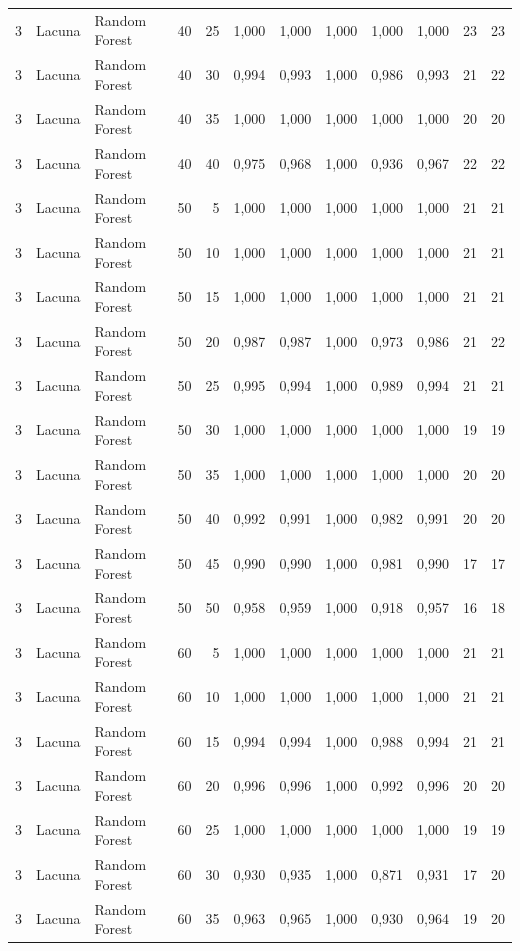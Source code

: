 \begin{longtable}{@{}rllrrrrrrrrr@{}}
3 & Lacuna & Random Forest & 40 & 25 & 1,000 & 1,000 & 1,000 & 1,000 & 1,000 & 23 & 23 \\
3 & Lacuna & Random Forest & 40 & 30 & 0,994 & 0,993 & 1,000 & 0,986 & 0,993 & 21 & 22 \\
3 & Lacuna & Random Forest & 40 & 35 & 1,000 & 1,000 & 1,000 & 1,000 & 1,000 & 20 & 20 \\
3 & Lacuna & Random Forest & 40 & 40 & 0,975 & 0,968 & 1,000 & 0,936 & 0,967 & 22 & 22 \\
3 & Lacuna & Random Forest & 50 & 5 & 1,000 & 1,000 & 1,000 & 1,000 & 1,000 & 21 & 21 \\
3 & Lacuna & Random Forest & 50 & 10 & 1,000 & 1,000 & 1,000 & 1,000 & 1,000 & 21 & 21 \\
3 & Lacuna & Random Forest & 50 & 15 & 1,000 & 1,000 & 1,000 & 1,000 & 1,000 & 21 & 21 \\
3 & Lacuna & Random Forest & 50 & 20 & 0,987 & 0,987 & 1,000 & 0,973 & 0,986 & 21 & 22 \\
3 & Lacuna & Random Forest & 50 & 25 & 0,995 & 0,994 & 1,000 & 0,989 & 0,994 & 21 & 21 \\
3 & Lacuna & Random Forest & 50 & 30 & 1,000 & 1,000 & 1,000 & 1,000 & 1,000 & 19 & 19 \\
3 & Lacuna & Random Forest & 50 & 35 & 1,000 & 1,000 & 1,000 & 1,000 & 1,000 & 20 & 20 \\
3 & Lacuna & Random Forest & 50 & 40 & 0,992 & 0,991 & 1,000 & 0,982 & 0,991 & 20 & 20 \\
3 & Lacuna & Random Forest & 50 & 45 & 0,990 & 0,990 & 1,000 & 0,981 & 0,990 & 17 & 17 \\
3 & Lacuna & Random Forest & 50 & 50 & 0,958 & 0,959 & 1,000 & 0,918 & 0,957 & 16 & 18 \\
3 & Lacuna & Random Forest & 60 & 5 & 1,000 & 1,000 & 1,000 & 1,000 & 1,000 & 21 & 21 \\
3 & Lacuna & Random Forest & 60 & 10 & 1,000 & 1,000 & 1,000 & 1,000 & 1,000 & 21 & 21 \\
3 & Lacuna & Random Forest & 60 & 15 & 0,994 & 0,994 & 1,000 & 0,988 & 0,994 & 21 & 21 \\
3 & Lacuna & Random Forest & 60 & 20 & 0,996 & 0,996 & 1,000 & 0,992 & 0,996 & 20 & 20 \\
3 & Lacuna & Random Forest & 60 & 25 & 1,000 & 1,000 & 1,000 & 1,000 & 1,000 & 19 & 19 \\
3 & Lacuna & Random Forest & 60 & 30 & 0,930 & 0,935 & 1,000 & 0,871 & 0,931 & 17 & 20 \\
3 & Lacuna & Random Forest & 60 & 35 & 0,963 & 0,965 & 1,000 & 0,930 & 0,964 & 19 & 20 \\

\end{longtable}
